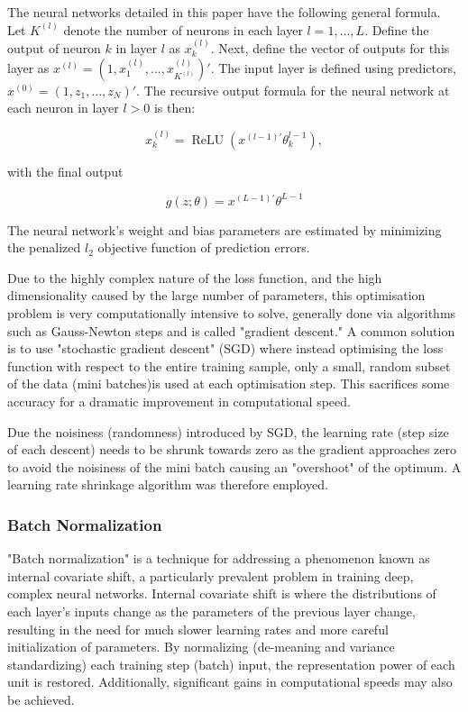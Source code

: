 \documentclass[man, a4paper, biblatex]{article}
\begin{document}
The neural networks detailed in this paper have the following general formula. Let $K^(l)$ denote the number of neurons in each layer $l = 1, \dots, L$. Define the output of neuron $k$ in layer $l$ as $x_k^(l)$. Next, define the vector of outputs for this layer as $x^(l) = (1, x_1^(l), \dots, x_{K^(l)}^(l))'$. The input layer is defined using predictors, $x^(0) = (1, z_1, \dots, z_N)'$. The recursive output formula for the neural network at each neuron in layer $l > 0$ is then:

\begin{equation}
	x_k^{(l)} = \operatorname{ReLU}(x^{(l-1)'}\theta_k^{l-1}),
\end{equation}

with the final output

\begin{equation}
	g(z;\theta) = x^{(L-1)'}\theta^{L-1}
\end{equation}

The neural network's weight and bias parameters are estimated by minimizing the penalized $l_2$ objective function of prediction errors.

Due to the highly complex nature of the loss function, and the high dimensionality caused by the large number of parameters, this optimisation problem is very computationally intensive to solve, generally done via algorithms such as Gauss-Newton steps and is called "gradient descent." A common solution is to use "stochastic gradient descent" (SGD) where instead optimising the loss function with respect to the entire training sample, only a small, random subset of the data (mini batches)is used at each optimisation step. This sacrifices some accuracy for a dramatic improvement in computational speed.

Due the noisiness (randomness) introduced by SGD, the learning rate (step size of each descent) needs to be shrunk towards zero as the gradient approaches zero to avoid the noisiness of the mini batch causing an "overshoot" of the optimum. A learning rate shrinkage algorithm was therefore employed.

\subsubsection{Batch Normalization}

"Batch normalization" is a technique for addressing a phenomenon known as internal covariate shift, a particularly prevalent problem in training deep, complex neural networks. Internal covariate shift is where the distributions of each layer's inputs change as the parameters of the previous layer change, resulting in the need for much slower learning rates and more careful initialization of parameters. By normalizing (de-meaning and variance standardizing) each training step (batch) input, the representation power of each unit is restored. Additionally, significant gains in computational speeds may also be achieved.
\end{document}
